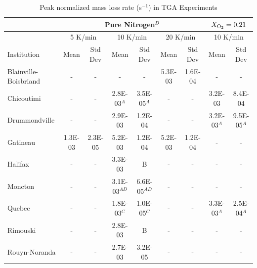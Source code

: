 \documentclass{book}
\begin{document}
\begin{table}[ht]
\caption{Peak normalized mass loss rate (s$^{-1}$) in TGA Experiments}
\label{Table_8}
\begin{center}
\begin{tabular}{|l|cc|cc|cc|cc|}
\hline
                        & \multicolumn{6}{|c|}{Pure Nitrogen$^D$} & \multicolumn{2}{|c|}{$X_{\rm O_2}=0.21$}                                                       \\  \hline
                        & \multicolumn{2}{|c|}{5 K/min} & \multicolumn{2}{|c|}{10 K/min}    & \multicolumn{2}{|c|}{20 K/min} & \multicolumn{2}{|c|}{10 K/min}      \\  \hline
Institution             & Mean        & Std Dev         & Mean           & Std Dev          & Mean       & Std Dev           & Mean        & Std Dev               \\  \hline
Blainville-Boisbriand   & -           & -               & -              & -                & 5.3E-03    & 1.6E-04           & -           & -                     \\
Chicoutimi              & -           & -               & 2.8E-03$^A$    & 3.5E-05$^A$      & -          & -                 & 3.2E-03     & 8.4E-04               \\
Drummondville           & -           & -               & 2.9E-03        & 1.2E-04          & -          & -                 & 3.2E-03$^A$ & 9.5E-05$^A$           \\
Gatineau                & 1.3E-03     & 2.3E-05         & 5.2E-03        & 1.2E-04          & 5.2E-03    & 1.2E-04           & -           & -                     \\
Halifax                 & -           & -               & 3.3E-03        & B                & -          & -                 & -           & -                     \\
Moncton                 & -           & -               & 3.1E-03$^{AD}$ & 6.6E-05$^{AD}$   & -          & -                 & -           & -                     \\
Quebec                  & -           & -               & 1.8E-03$^C$    & 1.0E-05$^C$      & -          & -                 & 3.3E-03$^A$ & 2.5E-04$^A$           \\
Rimouski                & -           & -               & 2.8E-03        & B                & -          & -                 & -           & -                     \\
Rouyn-Noranda           & -           & -               & 2.7E-03        & 3.2E-05          & -          & -                 & -           & -                     \\

\end{tabular}
\end{center}
\end{table}
\end{document}
